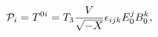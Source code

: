 \begin{equation} \label{mom}
{\cal P}_i = T^{0i} = T_3 \frac{V}{\sqrt{-X}} \epsilon_{ijk} E_0^j B_0^k,
\end{equation}

